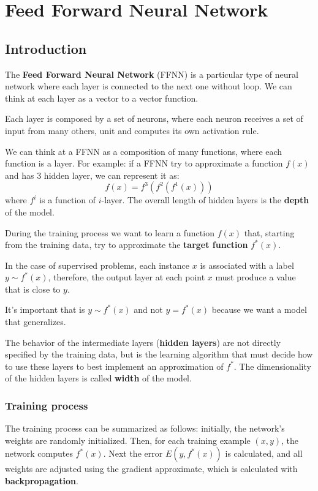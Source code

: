 \chapter{Feed Forward Neural Network}
\section{Introduction}
The \textbf{Feed Forward Neural Network} (FFNN) is a particular type of neural
network where each layer is connected to the next one without loop. We can think
at each layer as a vector to a vector function.

Each layer is composed by a set of neurons, where each neuron receives a set of input
from many others, unit and computes its own activation rule.

We can think at a FFNN as a composition of many functions, where each function is
a layer. For example: if a FFNN try to approximate a function $f(x)$ and has $3$
hidden layer, we can represent it as:
\begin{equation*}
    f(x) = f^3(f^2(f^1(x)))
\end{equation*}
where $f^i$ is a function of $i$-layer. The overall length of hidden layers is
the \textbf{depth} of the model.

During the training process we want to learn a function $f(x)$ that, starting from
the training data, try to approximate the \textbf{target function} $f^*(x)$.

In the case of supervised problems, each instance $x$ is associated with a label
$y\sim f^*(x)$, therefore, the output layer at each point $x$ must produce a value
that is close to $y$.
\begin{note}
    It's important that is $y \sim f^*(x)$ and not $y=f^*(x)$ because we want a
    model that generalizes.
\end{note}

The behavior of the intermediate layers (\textbf{hidden layers}) are not directly
specified by the training data, but is the learning algorithm that must decide
how to use these layers to best implement an approximation of $f^*$. The dimensionality
of the hidden layers is called \textbf{width} of the model.

\subsection{Training process}
The training process can be summarized as follows: initially, the network's weights
are randomly initialized. Then, for each training example $(x, y)$, the network
computes $f^\ast(x)$. Next the error $E(y, f^*(x))$ is calculated, and all weights
are adjusted using the gradient approximate, which is calculated with \textbf{backpropagation}.

